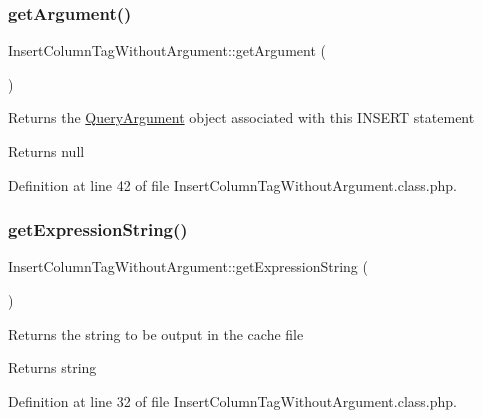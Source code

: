 \subsubsection{\texorpdfstring{get\+Argument()}{getArgument()}}
{\footnotesize\ttfamily Insert\+Column\+Tag\+Without\+Argument\+::get\+Argument (\begin{DoxyParamCaption}{ }\end{DoxyParamCaption})}

Returns the \hyperlink{classQueryArgument}{Query\+Argument} object associated with this I\+N\+S\+E\+RT statement

\begin{DoxyReturn}{Returns}
null 
\end{DoxyReturn}


Definition at line 42 of file Insert\+Column\+Tag\+Without\+Argument.\+class.\+php.

\mbox{\label{classInsertColumnTagWithoutArgument_a0ea3febe1aed5e5f0fd8ac97fb0a8ac6}} 
\subsubsection{\texorpdfstring{get\+Expression\+String()}{getExpressionString()}}
{\footnotesize\ttfamily Insert\+Column\+Tag\+Without\+Argument\+::get\+Expression\+String (\begin{DoxyParamCaption}{ }\end{DoxyParamCaption})}

Returns the string to be output in the cache file

\begin{DoxyReturn}{Returns}
string 
\end{DoxyReturn}


Definition at line 32 of file Insert\+Column\+Tag\+Without\+Argument.\+class.\+php.

\mbox{\label{classInsertColumnTagWithoutArgument_ae1e10363dd8d24dff6cd05ca7711e455}} 
